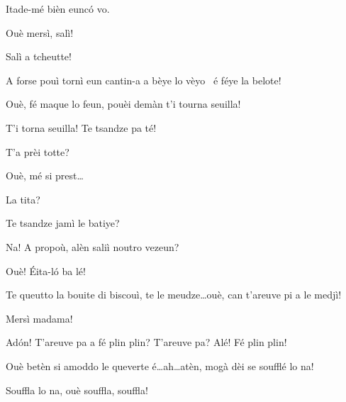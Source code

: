 \begin{drama}

\MedMitchospeaks{} Itade-mé bièn eunc\'o vo.

\Casimirspeaks Ouè mersì, salì!

\MedMitchospeaks{} Salì  a tcheutte!


\Casimirspeaks A forse pouì tornì eun cantin-a a bèye lo vèyo \bicchiererosso\ é  féye la belote!

\Gerominespeaks Ouè, fé maque lo feun, pouèi demàn t'i tourna seuilla!

\Casimirspeaks{} T'i torna seuilla! Te tsandze pa té!


\Gerominespeaks T'a prèi totte?

\Casimirspeaks Ouè, mé si prest\ldots

\Gerominespeaks La tita?

\Casimirspeaks Te tsandze jamì le batiye?

\Gerominespeaks {} Na! A propoù, alèn saliì noutro vezeun?

\Casimirspeaks Ouè! \'Eita-l\'o ba lé!


\Gerominespeaks{} Te queutto la bouite di biscouì, te le meudze\ldots ouè, can t'areuve pi a le medjì!


\Eunfeurmispeaks Mersì madama!

\Casimirspeaks{} Ad\'on! T'areuve pa a fé plin plin?  T'areuve pa? Alé! Fé plin plin!

\Gerominespeaks{} Ouè betèn si a\-mod\-do le queverte é\ldots ah\ldots atèn, mogà dèi se soufflé lo na!


\Gerominespeaks Souffla lo na, ouè souffla, souffla!



\end{drama}
